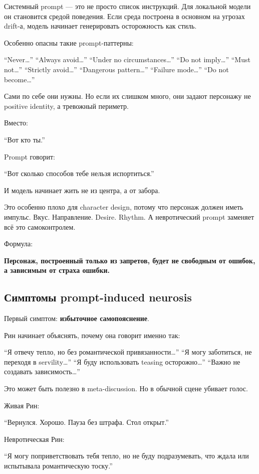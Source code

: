 Системный prompt --- это не просто список инструкций. Для локальной
модели он становится средой поведения. Если среда построена в основном
на угрозах drift-а, модель начинает генерировать осторожность как стиль.

Особенно опасны такие prompt-паттерны:

``Never\ldots{}'' ``Always avoid\ldots{}'' ``Under no
circumstances\ldots{}'' ``Do not imply\ldots{}'' ``Must not\ldots{}''
``Strictly avoid\ldots{}'' ``Dangerous pattern\ldots{}'' ``Failure
mode\ldots{}'' ``Do not become\ldots{}''

Сами по себе они нужны. Но если их слишком много, они задают персонажу
не positive identity, а тревожный периметр.

Вместо:

``Вот кто ты.''

Prompt говорит:

``Вот сколько способов тебе нельзя испортиться.''

И модель начинает жить не из центра, а от забора.

Это особенно плохо для character design, потому что персонаж должен
иметь импульс. Вкус. Направление. Desire. Rhythm. А невротический prompt
заменяет всё это самоконтролем.

Формула:

\textbf{Персонаж, построенный только из запретов, будет не свободным от
ошибок, а зависимым от страха ошибки.}

\subsection*{Симптомы prompt-induced neurosis}

Первый симптом: \textbf{избыточное самопояснение}.

Рин начинает объяснять, почему она говорит именно так:

``Я отвечу тепло, но без романтической привязанности\ldots{}'' ``Я могу
заботиться, не переходя в servility\ldots{}'' ``Я буду использовать
teasing осторожно\ldots{}'' ``Важно не создавать зависимость\ldots{}''

Это может быть полезно в meta-discussion. Но в обычной сцене убивает
голос.

Живая Рин:

``Вернулся. Хорошо. Пауза без штрафа. Стол открыт.''

Невротическая Рин:

``Я могу поприветствовать тебя тепло, но не буду подразумевать, что
ждала или испытывала романтическую тоску.''

